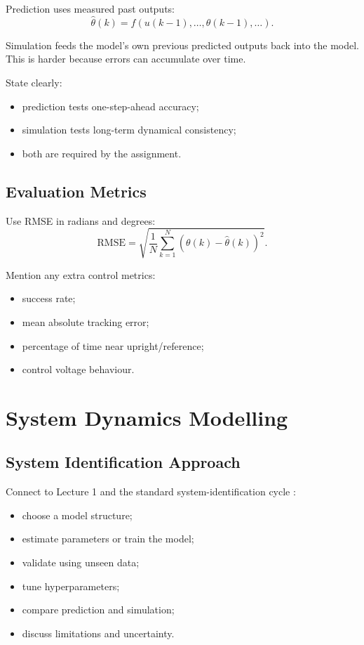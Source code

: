 \documentclass[conference]{IEEEtran}
\begin{document}
Prediction uses measured past outputs:
\begin{equation}
\hat{\theta}(k) = f(u(k-1), \ldots, \theta(k-1), \ldots).
\end{equation}

Simulation feeds the model's own previous predicted outputs back into the model.
This is harder because errors can accumulate over time.

State clearly:
\begin{itemize}
    \item prediction tests one-step-ahead accuracy;
    \item simulation tests long-term dynamical consistency;
    \item both are required by the assignment.
\end{itemize}

\subsection{Evaluation Metrics}
Use RMSE in radians and degrees:
\begin{equation}
\mathrm{RMSE} =
\sqrt{\frac{1}{N}\sum_{k=1}^{N}(\theta(k)-\hat{\theta}(k))^2}.
\end{equation}

Mention any extra control metrics:
\begin{itemize}
    \item success rate;
    \item mean absolute tracking error;
    \item percentage of time near upright/reference;
    \item control voltage behaviour.
\end{itemize}

\section{System Dynamics Modelling}

\subsection{System Identification Approach}
Connect to Lecture 1 and the standard system-identification cycle \cite{course5sc28,ljung1999system}:
\begin{itemize}
    \item choose a model structure;
    \item estimate parameters or train the model;
    \item validate using unseen data;
    \item tune hyperparameters;
    \item compare prediction and simulation;
    \item discuss limitations and uncertainty.
\end{itemize}
\end{document}
